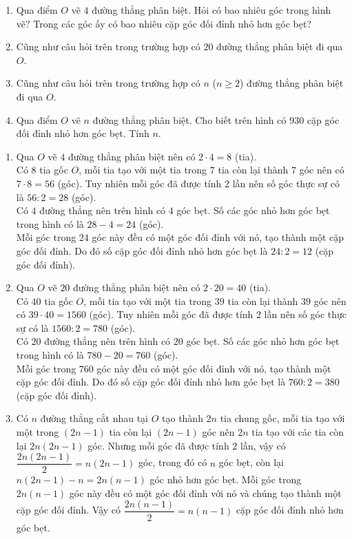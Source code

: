\begin{vn}
	\begin{enumerate}
		\item Qua điểm $O$ vẽ $4$ đường thẳng phân biệt. Hỏi có bao nhiêu góc trong hình vẽ? Trong các góc ấy có bao nhiêu cặp góc đối đỉnh nhỏ hơn góc bẹt?
		\item Cũng như câu hỏi trên trong trường hợp có $20$ đường thẳng phân biệt đi qua $O$.
		\item Cũng như câu hỏi trên trong trường hợp có $n$ ($n \ge 2$) đường thẳng phân biệt đi qua $O$.
		\item Qua điểm $O$ vẽ $n$ đường thẳng phân biệt. Cho biết trên hình có $930$ cặp góc đối đỉnh nhỏ hơn góc bẹt. Tính $n$.
	\end{enumerate}
	\loigiai 
	{
		\begin{enumerate}
			\item Qua $O$ vẽ $4$ đường thẳng phân biệt nên có $2 \cdot 4 = 8$ (tia).\\
			Có $8$ tia gốc $O$, mỗi tia tạo với một tia trong $7$ tia còn lại thành $7$ góc nên có $7 \cdot 8 = 56$ (góc). Tuy nhiên mỗi góc đã được tính $2$ lần nên số góc thực sự có là $56:2 = 28$ (góc).\\
			Có $4$ đường thẳng nên trên hình có $4$ góc bẹt. Số các góc nhỏ hơn góc bẹt trong hình có là $28-4=24$ (góc).\\
			Mỗi góc trong $24$ góc này đều có một góc đối đỉnh với nó, tạo thành một cặp góc đối đỉnh. Do đó số cặp góc đối đỉnh nhỏ hơn góc bẹt là $24:2=12$ (cặp góc đối đỉnh).
			\item Qua $O$ vẽ $20$ đường thẳng phân biệt nên có $2 \cdot 20 = 40$ (tia).\\
			Có $40$ tia gốc $O$, mỗi tia tạo với một tia trong $39$ tia còn lại thành $39$ góc nên có $39 \cdot 40 = 1560$ (góc). Tuy nhiên mỗi góc đã được tính $2$ lần nên số góc thực sự có là $1560:2 = 780$ (góc).\\
			Có $20$ đường thẳng nên trên hình có $20$ góc bẹt. Số các góc nhỏ hơn góc bẹt trong hình có là $780-20=760$ (góc).\\
			Mỗi góc trong $760$ góc này đều có một góc đối đỉnh với nó, tạo thành một cặp góc đối đỉnh. Do đó số cặp góc đối đỉnh nhỏ hơn góc bẹt là $760:2=380$ (cặp góc đối đỉnh).
			\item Có $n$ đường thẳng cắt nhau tại $O$ tạo thành $2n$ tia chung gốc, mỗi tia tạo với một trong $(2n-1)$ tia còn lại $(2n-1)$ góc nên $2n$ tia tạo với các tia còn lại $2n(2n-1)$ góc. Nhưng mỗi góc đã được tính $2$ lần, vậy có $\dfrac{2n(2n-1)}{2} = n(2n-1)$ góc, trong đó có $n$ góc bẹt, còn lại $n(2n-1) - n = 2n(n-1)$ góc nhỏ hơn góc bẹt. Mỗi góc trong $2n(n-1)$ góc này đều có một góc đối đỉnh với nó và chúng tạo thành một cặp góc đối đỉnh. Vậy có $\dfrac{2n(n-1)}{2} = n(n-1)$ cặp góc đối đỉnh nhỏ hơn góc bẹt.

\end{enumerate}}
\end{vn}
